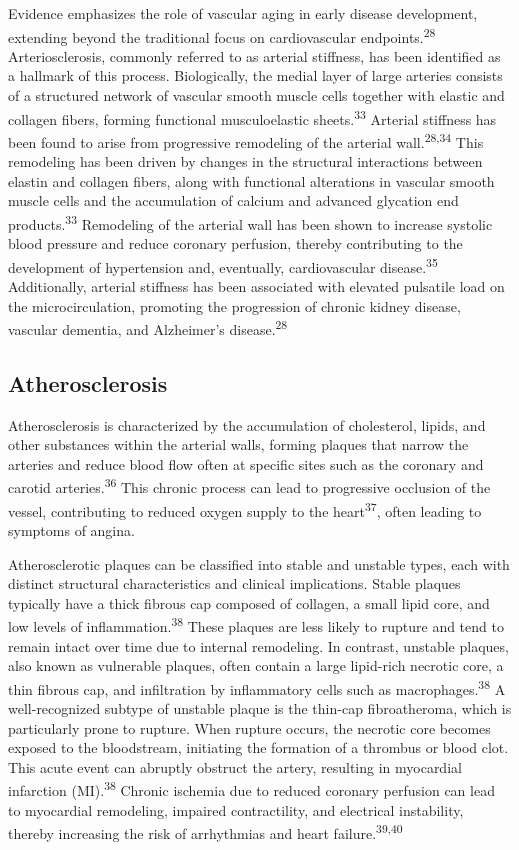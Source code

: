 \documentclass[
  a4paper,
  headsepline=true,
  open=left]{scrbook}
\begin{document}
Evidence emphasizes the role of vascular aging in early disease
development, extending beyond the traditional focus on cardiovascular
endpoints.\textsuperscript{28} Arteriosclerosis, commonly referred to as
arterial stiffness, has been identified as a hallmark of this process.
Biologically, the medial layer of large arteries consists of a
structured network of vascular smooth muscle cells together with elastic
and collagen fibers, forming functional musculoelastic
sheets.\textsuperscript{33} Arterial stiffness has been found to arise
from progressive remodeling of the arterial wall.\textsuperscript{28,34}
This remodeling has been driven by changes in the structural
interactions between elastin and collagen fibers, along with functional
alterations in vascular smooth muscle cells and the accumulation of
calcium and advanced glycation end products.\textsuperscript{33}
Remodeling of the arterial wall has been shown to increase systolic
blood pressure and reduce coronary perfusion, thereby contributing to
the development of hypertension and, eventually, cardiovascular
disease.\textsuperscript{35} Additionally, arterial stiffness has been
associated with elevated pulsatile load on the microcirculation,
promoting the progression of chronic kidney disease, vascular dementia,
and Alzheimer's disease.\textsuperscript{28}

\hypertarget{atherosclerosis}{%
\subsection{Atherosclerosis}\label{atherosclerosis}}

Atherosclerosis is characterized by the accumulation of cholesterol,
lipids, and other substances within the arterial walls, forming plaques
that narrow the arteries and reduce blood flow often at specific sites
such as the coronary and carotid arteries.\textsuperscript{36} This
chronic process can lead to progressive occlusion of the vessel,
contributing to reduced oxygen supply to the heart\textsuperscript{37},
often leading to symptoms of angina.

Atherosclerotic plaques can be classified into stable and unstable
types, each with distinct structural characteristics and clinical
implications. Stable plaques typically have a thick fibrous cap composed
of collagen, a small lipid core, and low levels of
inflammation.\textsuperscript{38} These plaques are less likely to
rupture and tend to remain intact over time due to internal remodeling.
In contrast, unstable plaques, also known as vulnerable plaques, often
contain a large lipid-rich necrotic core, a thin fibrous cap, and
infiltration by inflammatory cells such as
macrophages.\textsuperscript{38} A well-recognized subtype of unstable
plaque is the thin-cap fibroatheroma, which is particularly prone to
rupture. When rupture occurs, the necrotic core becomes exposed to the
bloodstream, initiating the formation of a thrombus or blood clot. This
acute event can abruptly obstruct the artery, resulting in myocardial
infarction (MI).\textsuperscript{38} Chronic ischemia due to reduced
coronary perfusion can lead to myocardial remodeling, impaired
contractility, and electrical instability, thereby increasing the risk
of arrhythmias and heart failure.\textsuperscript{39,40}
\end{document}
